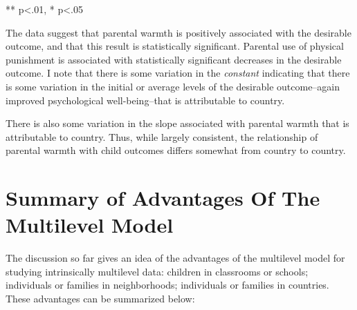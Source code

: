 \documentclass[
  letterpaper,
  DIV=11,
  numbers=noendperiod]{scrreprt}
\begin{document}
** p\textless.01, * p\textless.05

The data suggest that parental warmth is positively associated with the
desirable outcome, and that this result is statistically significant.
Parental use of physical punishment is associated with statistically
significant decreases in the desirable outcome. I note that there is
some variation in the \emph{constant} indicating that there is some
variation in the initial or average levels of the desirable
outcome--again improved psychological well-being--that is attributable
to country.

There is also some variation in the slope associated with parental
warmth that is attributable to country. Thus, while largely consistent,
the relationship of parental warmth with child outcomes differs somewhat
from country to country.

\hypertarget{summary-of-advantages-of-the-multilevel-model}{%
\section{Summary of Advantages Of The Multilevel
Model}\label{summary-of-advantages-of-the-multilevel-model}}

The discussion so far gives an idea of the advantages of the multilevel
model for studying intrinsically multilevel data: children in classrooms
or schools; individuals or families in neighborhoods; individuals or
families in countries. These advantages can be summarized below:
\end{document}
